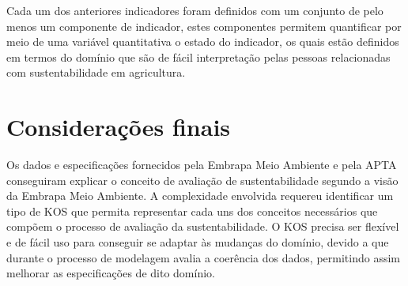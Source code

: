Cada um dos anteriores indicadores foram definidos com um conjunto
de pelo menos um componente de indicador, estes componentes permitem
quantificar por meio de uma variável quantitativa o estado do indicador,
os quais estão definidos em termos do domínio que são de fácil interpretação
pelas pessoas relacionadas com sustentabilidade em agricultura.

\section{Considerações finais}

Os dados e especificações fornecidos pela Embrapa Meio Ambiente e
pela APTA conseguiram explicar o conceito de avaliação de sustentabilidade
segundo a visão da Embrapa Meio Ambiente. A complexidade envolvida
requereu identificar um tipo de KOS que permita representar cada uns
dos conceitos necessários que compõem o processo de avaliação da sustentabilidade.
O KOS precisa ser flexível e de fácil uso para conseguir se adaptar
às mudanças do domínio, devido a que durante o processo de modelagem
avalia a coerência dos dados, permitindo assim melhorar as especificações
de dito domínio.
